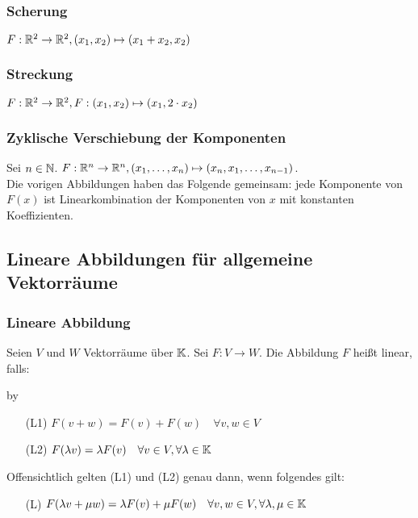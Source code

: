 \subsubsection{Scherung}
	$ F: \mathbb R^2 \to \mathbb R^2, (x_1, x_2) \mapsto (x_1 + x_2, x_2) $

\subsubsection{Streckung}
	$ F: \mathbb R^2 \to \mathbb R^2, F: (x_1, x_2) \mapsto (x_1, 2 \cdot x_2) $

\subsubsection{Zyklische Verschiebung der Komponenten}
	Sei $ n \in \mathbb N $. $ F : \mathbb R^n \to \mathbb R^n, (x_1, \ldots, x_n) \mapsto (x_n, x_1, \ldots, x_{n-1}) $.\\[10pt]
	Die vorigen Abbildungen haben das Folgende gemeinsam: jede Komponente von $ F(x) $ ist Linearkombination der Komponenten von $ x $ mit konstanten Koeffizienten.

\subsection{Lineare Abbildungen für allgemeine Vektorräume}
\subsubsection{Lineare Abbildung}
Seien $ V $ und $ W $ Vektorräume über $ \mathbb K $. Sei $ F: V \to W $. Die Abbildung $ F $ heißt linear, falls:

\advance\myindent by \the{}

\begin{itemize}
	\item [(L1)]
		$ F(v+w) = F(v) + F(w) \quad \forall v,w \in V $
	\item [(L2)]
		$ F(\lambda v) = \lambda F(v) \quad \forall v \in V, \forall \lambda \in \mathbb K $
\end{itemize}
\begin{bem}
	Offensichtlich gelten (L1) und (L2) genau dann, wenn folgendes gilt:
	\begin{itemize}[leftmargin=\myindent]
		\item[(L)]
			$ F(\lambda v + \mu w) = \lambda F(v) + \mu F(w) \quad \forall v,w \in V, \forall \lambda, \mu \in \mathbb K $
	\end{itemize}
\end{bem}

